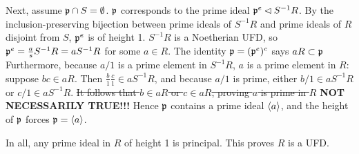 \documentclass[12pt]{article}
\begin{document}
Next, assume $\mathfrak{p} \cap S = \emptyset$. 
$\mathfrak{p}$ corresponds to the prime ideal $\mathfrak{p}^{e} \lhd S^{-1}R$. 
By the inclusion-preserving bijection between prime ideals of $S^{-1}R$ and prime ideals of $R$ disjoint from $S$, $\mathfrak{p}^{e}$ is of height 1.
$S^{-1}R$ is a Noetherian UFD, so $\mathfrak{p}^{e} = \frac{a}{s} S^{-1}R = a S^{-1}R$ for some $a \in R$. 
The identity $\mathfrak{p} = (\mathfrak{p}^{e})^{c}$ says $aR \subset \mathfrak{p}$ 
Furthermore, because $a / 1$ is a prime element in $S^{-1}R$, $a$ is a prime element in $R$:
suppose $bc \in aR$. 
Then $\frac{b}{1} \frac{c}{1} \in aS^{-1}R$, and because $a / 1$ is prime, either $b / 1 \in aS^{-1}R$ or $c / 1 \in aS^{-1}R$. 
\sout{It follows that $b \in aR$ or $c \in aR$, proving $a$ is prime in $R$}  \textbf{NOT NECESSARILY TRUE!!!}
Hence $\mathfrak{p}$ contains a prime ideal $\langle a\rangle$, and the height of $\mathfrak{p}$ forces $\mathfrak{p} = \langle a\rangle$. 

In all, any prime ideal in $R$ of height 1 is principal. 
This proves $R$ is a UFD. 

\setcounter{subsection}{19} 
\end{document}
